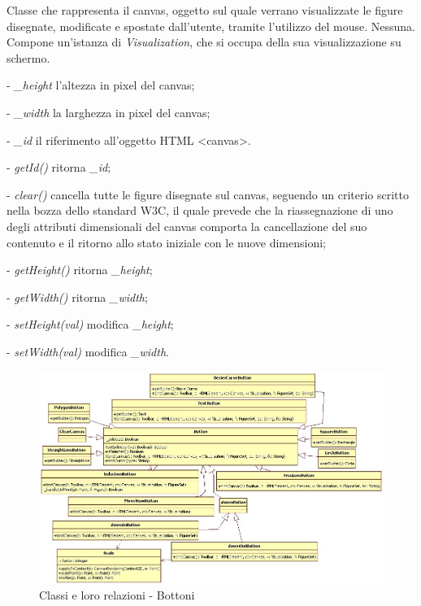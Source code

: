 Classe che rappresenta il canvas, oggetto sul quale verrano visualizzate le figure disegnate, modificate e spostate dall'utente, tramite l'utilizzo del mouse. 
Nessuna.
Compone un'istanza di \textit{Visualization}, che si occupa della sua visualizzazione su schermo.
\begin{elencopuntato}[\subsubsecindent]
\item[-] \textit{{\_}height} l'altezza in pixel del canvas;
\item[-] \textit{{\_}width} la larghezza in pixel del canvas;
\item[-] \textit{{\_}id} il riferimento all'oggetto HTML <canvas>.
\end{elencopuntato}
\begin{elencopuntato}[\subsubsecindent]
\item[-] \textit{getId()} ritorna  \textit{{\_}id};
\item[-] \textit{clear()} cancella tutte le figure disegnate sul canvas, seguendo un criterio scritto nella bozza dello standard W3C, il quale prevede che la riassegnazione di uno degli attributi dimensionali del canvas comporta la cancellazione del suo contenuto e il ritorno allo stato iniziale con le nuove dimensioni;
\item[-] \textit{getHeight()} ritorna  \textit{{\_}height};
\item[-] \textit{getWidth()} ritorna  \textit{{\_}width};
\item[-] \textit{setHeight(val)} modifica \textit{{\_}height};
\item[-] \textit{setWidth(val)} modifica \textit{{\_}width}.
\end{elencopuntato}
\newpage


\begin{figure}[!ht]
\centering
\includegraphics[scale=0.5]{button.jpg}
\caption{Classi e loro relazioni - Bottoni}
\end{figure}


